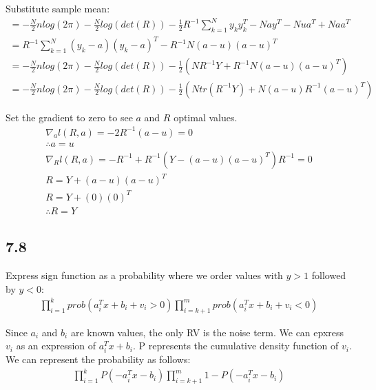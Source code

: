 \documentclass[12pt]{article}
\begin{document}
Substitute sample mean:
\begin{equation*}
\begin{aligned}
= -\frac{N}{2}nlog(2\pi)-\frac{N}{2}log(det(R))- \frac{1}{2}R^{-1}\sum_{k=1}^{N}y_ky_k^T-Nay^T-Nua^T+Naa^T\\
= R^{-1}\sum_{k=1}^{N}(y_k-a)(y_k-a)^T-R^{-1}N(a-u)(a-u)^T\\
= -\frac{N}{2}nlog(2\pi)-\frac{N}{2}log(det(R))- \frac{1}{2}(NR^{-1}Y + R^{-1}N(a-u)(a-u)^T)\\
= -\frac{N}{2}nlog(2\pi)-\frac{N}{2}log(det(R))- \frac{1}{2}(Ntr(R^{-1}Y) + N(a-u)R^{-1}(a-u)^T)
\end{aligned}
\end{equation*}

Set the gradient to zero to see $a$ and $R$ optimal values.
\begin{equation*}
\begin{aligned}
\nabla_a l(R,a) = -2R^{-1}(a-u) = 0\\
\therefore a=u \\
\nabla_R l(R,a) = -R^{-1} + R^{-1}(Y - (a-u)(a-u)^T)R^{-1} = 0\\
R = Y + (a-u)(a-u)^T\\
R = Y + (0)(0)^T\\
\therefore R=Y
\end{aligned}
\end{equation*}

\subsection*{7.8}

Express sign function as a probability where we order values with $y>1$ followed by $y<0$:
\begin{equation*}
\begin{aligned}
\prod_{i=1}^{k}prob(a_i^Tx + b_i + v_i > 0)\prod_{i=k+1}^{m}prob(a_i^Tx + b_i + v_i < 0)
\end{aligned}
\end{equation*}

Since $a_i$ and $b_i$ are known values, the only RV is the noise term. We can epxress $v_i$ as an expression of $a_i^Tx+b_i$. P represents the cumulative density function of $v_i$. We can represent the probability as follows:
\begin{equation*}
\begin{aligned}
\prod_{i=1}^{k}P(-a_i^Tx-b_i)\prod_{i=k+1}^{m}1-P(-a_i^Tx-b_i) 
\end{aligned}
\end{equation*}
\end{document}
